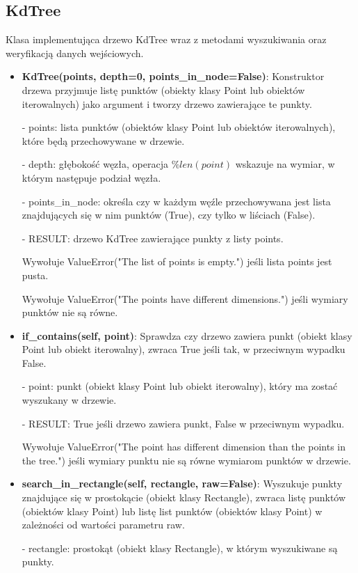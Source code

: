 \documentclass{lab}
\begin{document}
\subsection{KdTree}
Klasa implementująca drzewo KdTree wraz z metodami wyszukiwania oraz weryfikacją danych wejściowych.
\begin{itemize}
  \item \textbf{KdTree(points, depth=0, points\_in\_node=False)}:
  Konstruktor drzewa przyjmuje listę punktów (obiekty klasy Point lub obiektów iterowalnych) jako argument i tworzy drzewo zawierające te punkty.
  
  - points: lista punktów (obiektów klasy Point lub obiektów iterowalnych), które będą przechowywane w drzewie.

  - depth: głębokość węzła, operacja $\%len(point)$ wskazuje na wymiar, w którym następuje podział węzła.

  - points\_in\_node: określa czy w każdym węźle przechowywana jest lista znajdujących się w nim punktów (True), czy tylko w liściach (False).

  - RESULT: drzewo KdTree zawierające punkty z listy points.

  Wywołuje ValueError("The list of points is empty.") jeśli lista points jest pusta.

  Wywołuje ValueError("The points have different dimensions.") jeśli wymiary punktów nie są równe.
  
  \item \textbf{if\_contains(self, point)}:
  Sprawdza czy drzewo zawiera punkt (obiekt klasy Point lub obiekt iterowalny), zwraca True jeśli tak, w przeciwnym wypadku False.

  - point: punkt (obiekt klasy Point lub obiekt iterowalny), który ma zostać wyszukany w drzewie.

  - RESULT: True jeśli drzewo zawiera punkt, False w przeciwnym wypadku.

  Wywołuje ValueError("The point has different dimension than the points in the tree.") jeśli wymiary punktu nie są równe wymiarom punktów w drzewie.

  \item \textbf{search\_in\_rectangle(self, rectangle, raw=False)}:
  Wyszukuje punkty znajdujące się w prostokącie (obiekt klasy Rectangle), zwraca listę punktów (obiektów klasy Point) lub listę list punktów (obiektów klasy Point) w zależności od wartości parametru raw.

  - rectangle: prostokąt (obiekt klasy Rectangle), w którym wyszukiwane są punkty.


\end{itemize}
\end{document}

